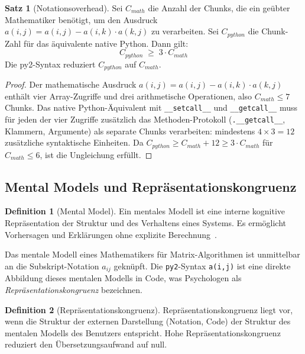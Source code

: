 \documentclass[a4paper,12pt]{article}
\theoremstyle{definition}
\newtheorem{definition}{Definition}
\newtheorem{satz}{Satz}
\begin{document}
\begin{satz}[Notationsoverhead]
	Sei $C_{math}$ die Anzahl der Chunks, die ein ge\"ubter Mathematiker ben\"otigt,
	um den Ausdruck $a(i,j) = a(i,j) - a(i,k) \cdot a(k,j)$ zu verarbeiten. Sei
	$C_{python}$ die Chunk-Zahl f\"ur das \"aquivalente native Python. Dann gilt:
	\[
		C_{python} \;\geq\; 3 \cdot C_{math}
	\]
	Die py2-Syntax reduziert $C_{python}$ auf $C_{math}$.
\end{satz}

\begin{proof}
	Der mathematische Ausdruck $a(i,j) = a(i,j) - a(i,k) \cdot a(k,j)$ enth\"alt
	vier Array-Zugriffe und drei arithmetische Operationen, also $C_{math} \leq 7$ Chunks.
	Das native Python-\"Aquivalent mit \texttt{\_\_setcall\_\_} und \texttt{\_\_getcall\_\_}
	muss f\"ur jeden der vier Zugriffe zus\"atzlich das Methoden-Protokoll (\texttt{.\_\_getcall\_\_},
	Klammern, Argumente) als separate Chunks verarbeiten: mindestens $4 \times 3 = 12$
	zus\"atzliche syntaktische Einheiten. Da $C_{python} \geq C_{math} + 12 \geq 3 \cdot C_{math}$
	f\"ur $C_{math} \leq 6$, ist die Ungleichung erf\"ullt.
\end{proof}

\subsection{Mental Models und Repr\"asentationskongruenz}

\begin{definition}[Mental Model]
	Ein mentales Modell ist eine interne kognitive Repr\"asentation der Struktur und
	des Verhaltens eines Systems. Es erm\"oglicht Vorhersagen und Erkl\"arungen ohne
	explizite Berechnung~\cite{johnson-laird1983}.
\end{definition}

Das mentale Modell eines Mathematikers f\"ur Matrix-Algorithmen ist unmittelbar an die
Subskript-Notation $a_{ij}$ gekn\"upft. Die \texttt{py2}-Syntax \texttt{a(i,j)} ist
eine direkte Abbildung dieses mentalen Modells in Code, was Psychologen als
\emph{Repr\"asentationskongruenz} bezeichnen.

\begin{definition}[Repr\"asentationskongruenz]
	Repr\"asentationskongruenz liegt vor, wenn die Struktur der externen Darstellung
	(Notation, Code) der Struktur des mentalen Modells des Benutzers entspricht.
	Hohe Repr\"asentationskongruenz reduziert den \"Ubersetzungsaufwand auf null.
\end{definition}
\end{document}

